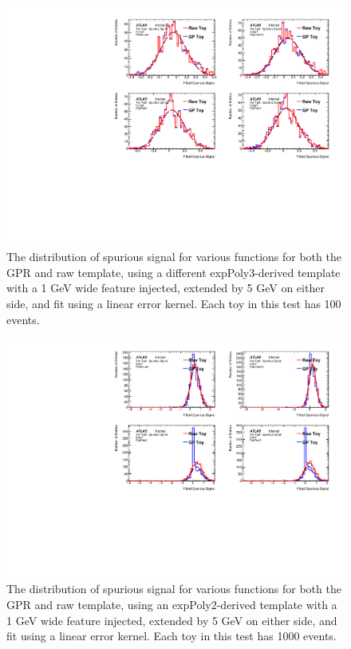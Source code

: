 \begin{figure} 
\begin{center}
  \includegraphics[width=\textwidth]{figures/background/gpr/validation/linear/ToyTest_FitSigVals_highpT_100_Sig_1s}   
\caption{The distribution of spurious signal for various functions for both the GPR and raw template, using a different expPoly3-derived template with a 1 GeV wide feature injected, extended by 5 GeV on either side, and fit using a linear error kernel. Each toy in this test has 100 events.}
\label{fig:linearkernel_highpt_100_Sig_1s}
\end{center}
\end{figure}

\begin{figure} 
\begin{center}
  \includegraphics[width=\textwidth]{figures/background/gpr/validation/linear/ToyTest_FitSigVals_lowpT_1000_Sig_1s}   
\caption{The distribution of spurious signal for various functions for both the GPR and raw template, using an expPoly2-derived template with a 1 GeV wide feature injected, extended by 5 GeV on either side, and fit using a linear error kernel. Each toy in this test has 1000 events.}
\label{fig:linearkernel_lowpt_1000_Sig_1s}
\end{center}
\end{figure}

